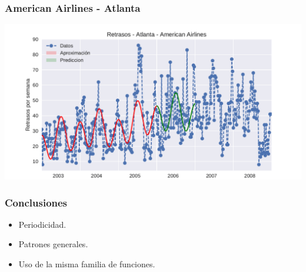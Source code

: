 \documentclass{beamer}
\begin{document}
\begin{frame}


\frametitle{American Airlines - Atlanta}

{\centering
  \includegraphics[width=1.0\linewidth]{diapos/imagenes/retrasosAmericanAirlinesATLvol3.pdf}
}

\end{frame}


\begin{frame}

\frametitle{Conclusiones}


\begin{itemize}
    \item{Periodicidad.}
    \item{Patrones generales.}
    \item{Uso de la misma familia de funciones.}
\end{itemize}


\end{frame}




\end{document}

